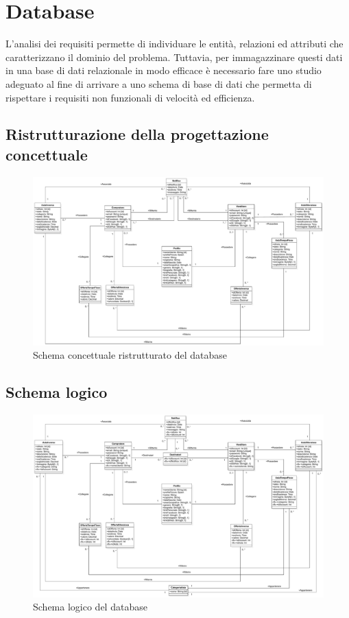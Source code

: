     \clearpage
    
    \section{Database}
        L'analisi dei requisiti permette di individuare le entità, relazioni ed attributi che caratterizzano il dominio del problema. Tuttavia, per immagazzinare questi dati in una base di dati relazionale in modo efficace è necessario fare uno studio adeguato al fine di arrivare a uno schema di base di dati che permetta di rispettare i requisiti non funzionali di velocità ed efficienza.
    
        \subsection{Ristrutturazione della progettazione concettuale}
            \begin{figure}[htbp!]
                \centering
                    \includegraphics[width=0.73\linewidth]{Immagini/Diagrammi/Class Diagram/Design/ClassDiagramDatabaseRistrutturato.pdf}
                \caption{Schema concettuale ristrutturato del database}
                \label{fig:Schema concettuale ristrutturato del database}
            \end{figure}
            
        \subsection{Schema logico}
            \begin{figure}[htbp!]
                \centering
                    \includegraphics[width=0.73\linewidth]{Immagini/Diagrammi/Class Diagram/Design/ClassDiagramDatabaseLogico.pdf}
                \caption{Schema logico del database}
                \label{fig:Schema logico del database}
            \end{figure}

